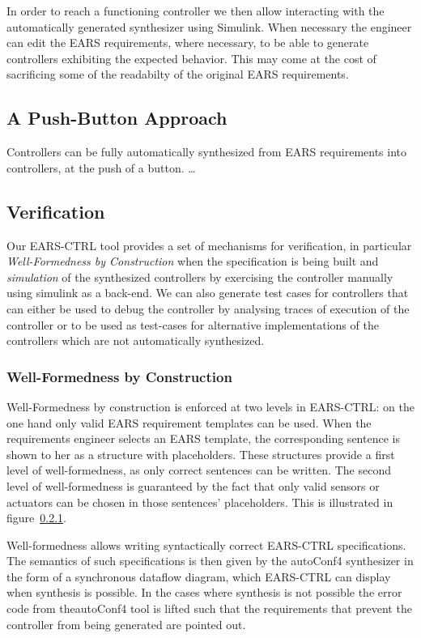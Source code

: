 In order to reach a functioning controller we then allow interacting with the
automatically generated synthesizer using Simulink. When necessary the engineer
can edit the EARS requirements, where necessary, to be able to generate
controllers exhibiting the expected behavior. This may come at the cost of
sacrificing some of the readabilty of the original EARS
requirements.

\subsection{A Push-Button Approach}

Controllers can be fully automatically synthesized from EARS requirements into
controllers, at the push of a button. \ldots

\subsection{Verification}

Our \textsf{EARS-CTRL} tool provides a set of mechanisms for verification, in
particular \emph{Well-Formedness by Construction} when the specification is
being built and \emph{simulation} of the synthesized controllers by exercising the
controller manually using \textsf{simulink} as a back-end. We can also generate
test cases for controllers that can either be used to debug the controller by
analysing traces of execution of the controller or to be used as test-cases for
alternative implementations of the controllers which are not automatically
synthesized.

\subsubsection{Well-Formedness by Construction}

Well-Formedness by construction is enforced at two levels in \textsf{EARS-CTRL}:
on the one hand only valid EARS requirement templates can be used. When the
requirements engineer selects an EARS template, the corresponding sentence is
shown to her as a structure with placeholders. These structures provide a
first level of well-formedness, as only correct sentences can be written. The
second level of well-formedness is guaranteed by the fact that only valid
sensors or actuators can be chosen in those sentences' placeholders. This is
illustrated in figure~\ref{}.

Well-formedness allows writing syntactically correct \textsf{EARS-CTRL}
specifications. The semantics of such specifications is then given by the
\textsf{autoConf4} synthesizer in the form of a synchronous dataflow diagram,
which \textsf{EARS-CTRL} can display when synthesis is possible. In the cases
where synthesis is not possible the error code from the\textsf{autoConf4} tool
is lifted such that the requirements that prevent the controller from being
generated are pointed out. 

